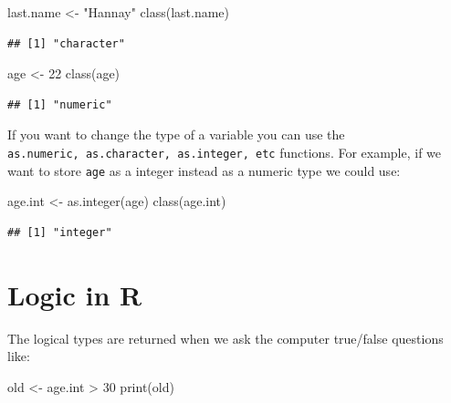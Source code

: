\documentclass[
]{book}
\newenvironment{Shaded}{\begin{snugshade}}{\end{snugshade}}
\newcommand{\DecValTok}[1]{\textcolor[rgb]{0.00,0.00,0.81}{#1}}
\newcommand{\FunctionTok}[1]{\textcolor[rgb]{0.00,0.00,0.00}{#1}}
\newcommand{\NormalTok}[1]{#1}
\newcommand{\OtherTok}[1]{\textcolor[rgb]{0.56,0.35,0.01}{#1}}
\newcommand{\SpecialCharTok}[1]{\textcolor[rgb]{0.00,0.00,0.00}{#1}}
\newcommand{\StringTok}[1]{\textcolor[rgb]{0.31,0.60,0.02}{#1}}
\theoremstyle{definition}
\theoremstyle{definition}
\theoremstyle{definition}
\theoremstyle{definition}
\theoremstyle{remark}
\begin{document}
\begin{Shaded}
\begin{Highlighting}[]
\NormalTok{last.name }\OtherTok{\textless{}{-}} \StringTok{"Hannay"}
\FunctionTok{class}\NormalTok{(last.name)}
\end{Highlighting}
\end{Shaded}

\begin{verbatim}
## [1] "character"
\end{verbatim}

\begin{Shaded}
\begin{Highlighting}[]
\NormalTok{age }\OtherTok{\textless{}{-}} \DecValTok{22}
\FunctionTok{class}\NormalTok{(age)}
\end{Highlighting}
\end{Shaded}

\begin{verbatim}
## [1] "numeric"
\end{verbatim}

If you want to change the type of a variable you can use the \texttt{as.numeric,\ as.character,\ as.integer,\ etc} functions. For example, if we want to store \texttt{age} as a integer instead as a numeric type we could use:

\begin{Shaded}
\begin{Highlighting}[]
\NormalTok{age.int }\OtherTok{\textless{}{-}} \FunctionTok{as.integer}\NormalTok{(age)}
\FunctionTok{class}\NormalTok{(age.int)}
\end{Highlighting}
\end{Shaded}

\begin{verbatim}
## [1] "integer"
\end{verbatim}

\hypertarget{logic-in-r}{%
\section{Logic in R}\label{logic-in-r}}

The logical types are returned when we ask the computer true/false questions like:

\begin{Shaded}
\begin{Highlighting}[]
\NormalTok{old }\OtherTok{\textless{}{-}}\NormalTok{ age.int }\SpecialCharTok{\textgreater{}} \DecValTok{30}
\FunctionTok{print}\NormalTok{(old)}
\end{Highlighting}
\end{Shaded}
\end{document}
